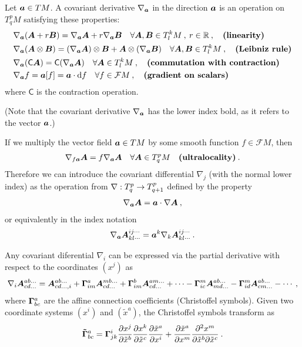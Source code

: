 \begin{definition}
    Let $\boldsymbol{a} \in TM$. A covariant derivative $\nabla_{\boldsymbol{a}}$ in the direction $\boldsymbol{a}$ is an operation on $T^p_q M$ satisfying these properties:
    \begin{align}
        &\nabla_{\boldsymbol{a}} (\boldsymbol{A} + r \boldsymbol{B}) = \nabla_{\boldsymbol{a}} \boldsymbol{A} + r \nabla_{\boldsymbol{a}} \boldsymbol{B} \quad \forall \boldsymbol{A},\boldsymbol{B} \in T^k_l M \:,\: r \in \mathbb{R} \:, \quad \textbf{(linearity)} \\
        &\nabla_{\boldsymbol{a}} (\boldsymbol{A} \otimes \boldsymbol{B}) = (\nabla_{\boldsymbol{a}} \boldsymbol{A}) \otimes \boldsymbol{B} + \boldsymbol{A} \otimes (\nabla_{\boldsymbol{a}} \boldsymbol{B}) \quad \forall \boldsymbol{A},\boldsymbol{B} \in T^k_l M \:, \quad \textbf{(Leibniz rule)} \\
        &\nabla_{\boldsymbol{a}} (\mathsf{C} \boldsymbol{A}) = \mathsf{C} (\nabla_{\boldsymbol{a}} \boldsymbol{A}) \quad \forall \boldsymbol{A} \in T^k_l M \:, \quad \textbf{(commutation with contraction)} \\
        &\nabla_{\boldsymbol{a}} f = \boldsymbol{a}[f] = \boldsymbol{a} \cdot \mathrm{d} f \quad \forall f \in \mathcal F M \:, \quad \textbf{(gradient on scalars)}
    \end{align}
    where $\mathsf{C}$ is the contraction operation.
\end{definition}
(Note that the covariant derivative $\nabla_{\boldsymbol{a}}$ has the lower index bold, as it refers to the vector $\boldsymbol{a}$.)

If we multiply the vector field $\boldsymbol{a} \in T M$ by some smooth function $f \in \mathcal F M$, then
\begin{align}
    \nabla_{f \boldsymbol{a}} \boldsymbol{A} = f \nabla_{\boldsymbol{a}} \boldsymbol{A} \quad \forall \boldsymbol{A} \in T^p_q M \quad \textbf{(ultralocality)}\:.
\end{align}
Therefore we can introduce the covariant differential $\nabla_j$ (with the normal lower index) as the operation from $\nabla : T^p_q \to T^p_{q+1}$ defined by the property
\begin{align}
    \nabla_{\boldsymbol{a}} \boldsymbol{A} = \boldsymbol{a} \cdot \nabla \boldsymbol{A} \:,
\end{align} 
or equivalently in the index notation
\begin{align}
    \nabla_{\boldsymbol{a}} \boldsymbol{A}^{ij\cdots}_{kl\cdots} = \boldsymbol{a}^k \nabla_k \boldsymbol{A}^{ij\cdots}_{kl\cdots} \:.
\end{align}

Any covariant diferential $\nabla_i$ can be expressed via the partial derivative with respect to the coordinates $(x^j)$ as
\begin{align}
    \nabla_i \boldsymbol{A}^{ab \dots}_{cd \dots} = \boldsymbol{A}^{ab \dots}_{cd \dots, i} + \boldsymbol{\Gamma}^{a}_{im} \boldsymbol{A}^{mb \dots}_{cd \dots} + \boldsymbol{\Gamma}^{b}_{im} \boldsymbol{A}^{am \dots}_{cd \dots} + \cdots
    - \boldsymbol{\Gamma}^{m}_{ic} \boldsymbol{A}^{ab \dots}_{md \dots} - \boldsymbol{\Gamma}^{m}_{id} \boldsymbol{A}^{ab \dots}_{cm \dots} - \cdots \:,
\end{align}
where $\boldsymbol{\Gamma}^{a}_{bc}$ are the affine connection coefficients (Christoffel symbols). Given two coordinate systems $(x^i)$ and $(\tilde x^a)$, the Christoffel symbols transform as
\begin{align}
    \boldsymbol{\tilde\Gamma}^{a}_{bc} = \boldsymbol{\Gamma}^i_{jk} \frac{\partial x^j}{\partial \tilde  x^b} \frac{\partial x^k}{\partial \tilde x^c}  \frac{\partial \tilde x^a}{\partial x^i} + \frac{\partial \tilde x^a}{\partial x^m} \frac{\partial^2 x^m}{\partial \tilde x^b \partial \tilde x^c} \:.
\end{align}

